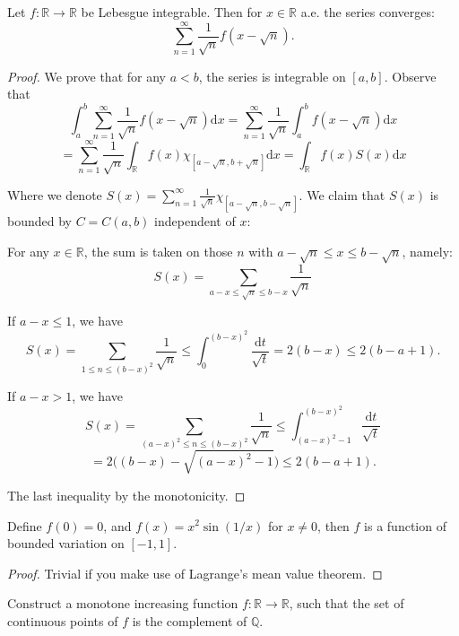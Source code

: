 \begin{problem}
Let $ f\colon\mathbb{R} \to \mathbb{R}  $ be Lebesgue integrable. Then for $ x\in \mathbb{R}  $ a.e. the series converges:
$$
\sum_{n=1}^{\infty}\frac{1}{\sqrt{n}}f( x-\sqrt{n} ).
$$
\end{problem}

\begin{proof}
	We prove that for any $ a<b $, the series is integrable on $ [a,b] $. Observe that
	$$
	\int_a^b{\sum_{n=1}^{\infty}{\frac{1}{\sqrt{n}}f( x-\sqrt{n} )}\mathrm{d} x}=\sum_{n=1}^{\infty}{\frac{1}{\sqrt{n}}\int_a^b{f( x-\sqrt{n} ) \mathrm{d} x}}
	$$
	$$
	=\sum_{n=1}^{\infty}{\frac{1}{\sqrt{n}}\int_{\mathbb{R}}^{}{f( x ) \chi _{[ a-\sqrt{n},b+\sqrt{n} ]}\mathrm{d} x}=\int_{\mathbb{R}}^{}{f( x ) S( x ) \mathrm{d} x}}
	$$
	
	Where we denote $
	S( x ) =\sum_{n=1}^{\infty}{\frac{1}{\sqrt{n}}\chi _{[ a-\sqrt{n},b-\sqrt{n} ]}}
	$. We claim that $ S(x) $ is bounded by $ C=C(a,b) $ independent of $ x $:
	
	For any $ x\in \mathbb{R}  $, the sum is taken on those $ n $ with $ a-\sqrt{n}\le x\le b-\sqrt{n} $, namely:$$
	S\left( x \right) =\sum_{a-x\le \sqrt{n}\le b-x}^{}{\frac{1}{\sqrt{n}}}
	$$
	
	If $ a-x\le 1 $, we have
	$$
	S( x ) =\sum_{1\le n\le ( b-x ) ^2}^{}{\frac{1}{\sqrt{n}}}\le \int_0^{\left( b-x \right) ^2}{\frac{\mathrm{d} t}{\sqrt{t}}}=2( b-x ) \le 2( b-a+1 ). 
	$$
	
	If $ a-x>1 $, we have
	$$
	S( x ) =\sum_{( a-x ) ^2\le n\le ( b-x ) ^2}^{}{\frac{1}{\sqrt{n}}}\le \int_{( a-x ) ^2-1}^{( b-x ) ^2}{\frac{\mathrm{d} t}{\sqrt{t}}}
	$$
	$$
	=2\Big( ( b-x ) -\sqrt{( a-x ) ^2-1} \Big) \le 2( b-a+1 ).
	$$
	
	The last inequality by the monotonicity.
\end{proof}

\begin{problem}
Define $ f(0)=0 $, and $ f(x)=x^{2}\sin (1/x) $ for $ x\ne 0 $, then $ f $ is a function of bounded variation on $ [-1,1] $.
\end{problem}

\begin{proof}
	Trivial if you make use of Lagrange's mean value theorem.
\end{proof}

\begin{problem}
Construct a monotone increasing function $ f\colon \mathbb{R} \to \mathbb{R}  $, such that the set of continuous points of $ f $ is the complement of $ \mathbb{Q}  $.
\end{problem}

